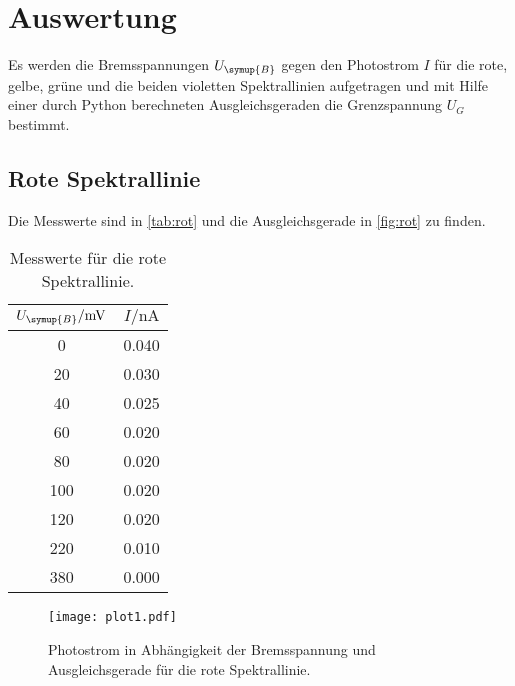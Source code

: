 \section{Auswertung}
\label{sec:Auswertung}
Es werden die Bremsspannungen $U_{\symup{B}}$ gegen den Photostrom $I$ für die rote, gelbe, grüne
und die beiden violetten Spektrallinien aufgetragen und mit Hilfe einer durch Python berechneten
Ausgleichsgeraden die Grenzspannung $U_G$ bestimmt.

\subsection{Rote Spektrallinie}
\label{sec:rote_Spektrallinie}
Die Messwerte sind in \autoref{tab:rot} und die Ausgleichsgerade in \autoref{fig:rot} zu finden.
\begin{table}
    \centering
    \caption{Messwerte für die rote Spektrallinie.}
    \label{tab:rot}
    \begin{tabular}{c c}
        \toprule
        $U_{\symup{B}} / \unit{\milli\volt}$ & $I / \unit{\nano\ampere}$ \\
        \midrule
          0 & 0.040 \\
         20 & 0.030 \\
         40 & 0.025 \\
         60 & 0.020 \\
         80 & 0.020 \\
        100 & 0.020 \\
        120 & 0.020 \\
        220 & 0.010 \\
        380 & 0.000 \\
        \bottomrule
    \end{tabular}
\end{table}

\begin{figure}
    \centering
    \label{fig:rot}
    \caption{Photostrom in Abhängigkeit der Bremsspannung und Ausgleichsgerade für die rote Spektrallinie.}
    \texttt{[image: plot1.pdf]}
\end{figure}